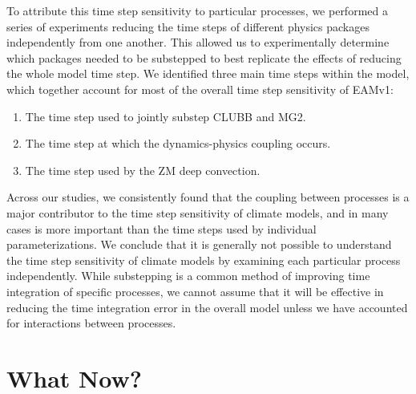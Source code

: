 \documentclass [11pt, proquest] {uwthesis}[2020/02/24]
\begin{document}
To attribute this time step sensitivity to particular processes, we performed a series of experiments reducing the time steps of different physics packages independently from one another. This allowed us to experimentally determine which packages needed to be substepped to best replicate the effects of reducing the whole model time step. We identified three main time steps within the model, which together account for most of the overall time step sensitivity of EAMv1:

\begin{enumerate}
    \item The time step used to jointly substep CLUBB and MG2.
    \item The time step at which the dynamics-physics coupling occurs.
    \item The time step used by the ZM deep convection.
\end{enumerate}

Across our studies, we consistently found that the coupling between processes is a major contributor to the time step sensitivity of climate models, and in many cases is more important than the time steps used by individual parameterizations. We conclude that it is generally not possible to understand the time step sensitivity of climate models by examining each particular process independently. While substepping is a common method of improving time integration of specific processes, we cannot assume that it will be effective in reducing the time integration error in the overall model unless we have accounted for interactions between processes.

\section{What Now?} \label{sec:future}
\end{document}
